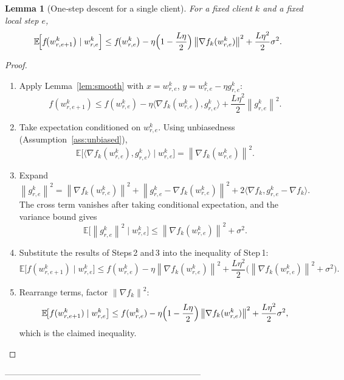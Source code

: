 \documentclass{article}
\newtheorem{lemma}{Lemma}
\newcommand{\EE}{\mathbb{E}}
\newcommand{\norm}[1]{\left\lVert#1\right\rVert}
\newcommand{\inner}[2]{\langle #1,#2\rangle}
\newcommand{\grad}{\nabla}
\begin{document}
\begin{lemma}[One‑step descent for a single client]\label{lem:descent}
For a fixed client $k$ and a fixed local step $e$,
\[
\EE\!\Bigl[f\!\bigl(w_{r,e+1}^{k}\bigr)\mid w_{r,e}^{k}\Bigr]
\le
f\!\bigl(w_{r,e}^{k}\bigr)
-\eta\Bigl(1-\frac{L\eta}{2}\Bigr)
      \norm{\grad f_k(w_{r,e}^{k})}^2
+\frac{L\eta^2}{2}\sigma^2 .
\] 
\end{lemma}
\begin{proof}
\begin{enumerate}
\item[Step 1.] Apply Lemma~\ref{lem:smooth} with $x=w_{r,e}^{k}$,
      $y=w_{r,e}^{k}-\eta g_{r,e}^{k}$:
      \[
      f(w_{r,e+1}^{k})\le f(w_{r,e}^{k})
         -\eta\inner{\grad f_k(w_{r,e}^{k})}{g_{r,e}^{k}}
         +\frac{L\eta^{2}}{2}\norm{g_{r,e}^{k}}^{2}.
      \]
\item[Step 2.] Take expectation conditioned on $w_{r,e}^{k}$.
      Using unbiasedness (Assumption~\ref{ass:unbiased}),
      \[
      \EE\!\bigl[\inner{\grad f_k(w_{r,e}^{k})}{g_{r,e}^{k}}\mid w_{r,e}^{k}\bigr]
      =\norm{\grad f_k(w_{r,e}^{k})}^{2}.
      \]
\item[Step 3.] Expand $\norm{g_{r,e}^{k}}^{2}
        =\norm{\grad f_k(w_{r,e}^{k})}^{2}
          +\norm{g_{r,e}^{k}-\grad f_k(w_{r,e}^{k})}^{2}
          +2\inner{\grad f_k}{g_{r,e}^{k}-\grad f_k}$.
      The cross term vanishes after taking conditional expectation,
      and the variance bound gives
      \[
      \EE\!\bigl[\norm{g_{r,e}^{k}}^{2}\mid w_{r,e}^{k}\bigr]
      \le \norm{\grad f_k(w_{r,e}^{k})}^{2}+\sigma^{2}.
      \] 
\item[Step 4.] Substitute the results of Steps 2 and 3 into the inequality of Step 1:
      \[
      \EE\!\bigl[f(w_{r,e+1}^{k})\mid w_{r,e}^{k}\bigr]
      \le f(w_{r,e}^{k})
          -\eta\norm{\grad f_k(w_{r,e}^{k})}^{2}
          +\frac{L\eta^{2}}{2}
            \bigl(\norm{\grad f_k(w_{r,e}^{k})}^{2}+\sigma^{2}\bigr).
      \]
\item[Step 5.] Rearrange terms, factor $\norm{\grad f_k}^{2}$:
      \[
      \EE\!\bigl[f(w_{r,e+1}^{k})\mid w_{r,e}^{k}\bigr]
      \le f(w_{r,e}^{k})
          -\eta\Bigl(1-\frac{L\eta}{2}\Bigr)
                \norm{\grad f_k(w_{r,e}^{k})}^{2}
          +\frac{L\eta^{2}}{2}\sigma^{2},
      \]
      which is the claimed inequality. \qedhere
\end{enumerate}
\end{proof}

---------------------------------------------------------------------
\end{document}
